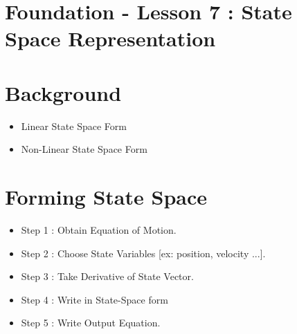 \documentclass[12pt,a4paper]{article}
\begin{document}
	\section*{\centering Foundation - Lesson 7 : State Space Representation}
	
	
	\section{Background}
	
	\begin{itemize}
		\item Linear State Space Form
	\end{itemize}
	
	\begin{itemize}
		\item Non-Linear State Space Form
	\end{itemize}
	
	\section{Forming State Space}
	\begin{itemize}
		\item Step 1 : Obtain Equation of Motion.
		\item Step 2 : Choose State Variables [ex: position, velocity ...].
		\item Step 3 : Take Derivative of State Vector.
		\item Step 4 : Write in State-Space form
		\item Step 5 : Write Output Equation.
	\end{itemize}
\end{document}
